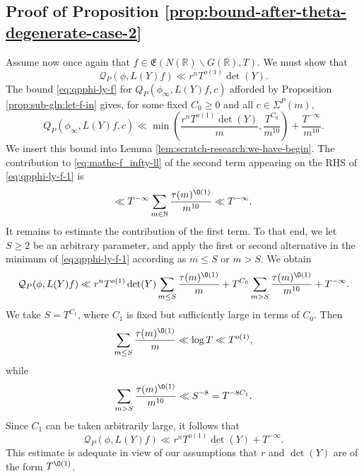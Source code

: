 \subsection{Proof of Proposition \ref{prop:bound-after-theta-degenerate-case-2}}
Assume now once again that $f \in \mathfrak{E}(N(\mathbb{R}) \backslash G(\mathbb{R}), T)$.  We must show that
\begin{equation*}
  \mathcal{Q}_P(\phi,L(Y) f)
  \ll
  r^{n} T^{o(1)} \det(Y).
\end{equation*}
The bound \eqref{eq:qpphi-ly-f} for $Q_P(\phi_\infty, L(Y) f, c)$ afforded by Proposition \ref{prop:sub-gln:let-f-in} gives, for some fixed $C_0 \geq 0$ and all $c \in \Sigma^P(m)$,
\begin{equation}\label{eq:qpphi-ly-f-1}
  Q_P(\phi_\infty, L(Y) f, c)
  \ll
  \min
  \left(
    \frac{r^n T^{o(1)} \det(Y) }{m},
    \frac{T^{C_0}}{m^{10}}
  \right)
  +
  \frac{T^{-\infty }}{m^{10}}.
\end{equation}
We insert this bound into Lemma \ref{lem:scratch-research:we-have-begin}.  The contribution to \eqref{eq:mathc-f_infty-ll} of the second term appearing on the RHS of \eqref{eq:qpphi-ly-f-1} is
\begin{equation*}
  \ll
  T^{-\infty}
  \sum_{m \in \mathbb{N} }
  \frac{\tau(m)^{\O(1)}}{m^{10}}
  \ll T^{-\infty}.
\end{equation*}
It remains to estimate the contribution of the first term.  To that end, we let $S \geq 2$ be an arbitrary parameter, and apply the first or second alternative in the minimum of \eqref{eq:qpphi-ly-f-1} according as $m \leq S$ or $m > S$.  We obtain
\begin{equation*}
  \mathcal{Q}_P(\phi, L(Y) f)
  \ll
  r^n T^{o(1)} \det(Y)
  \sum_{m \leq S}
  \frac{\tau(m)^{\O(1)}}{ m}
  +
  T^{C_0}
  \sum_{m > S}
  \frac{\tau(m)^{\O(1)}}{m^{10}}
  + T^{-\infty}.
\end{equation*}
We take $S = T^{C_1}$, where $C_1$ is fixed but sufficiently large in terms of $C_0$.  Then
\begin{equation*}
  \sum_{m \leq S} \frac{\tau(m)^{\O(1)}}{ m} \ll \log T \ll T^{o(1)},
\end{equation*}
while
\begin{equation*}
  \sum_{m > S} \frac{\tau(m)^{\O(1)}}{m^{10}} \ll S^{-8} = T^{-8 C_1}.
\end{equation*}
Since $C_1$ can be taken arbitrarily large, it follows that
\begin{equation*}
  \mathcal{Q}_P(\phi, L(Y) f)
  \ll
  r^n T^{o(1)} \det(Y) + T^{-\infty}.
\end{equation*}
This estimate is adequate in view of our assumptions that $r$ and $\det(Y)$ are of the form $T^{\O(1)}$.

